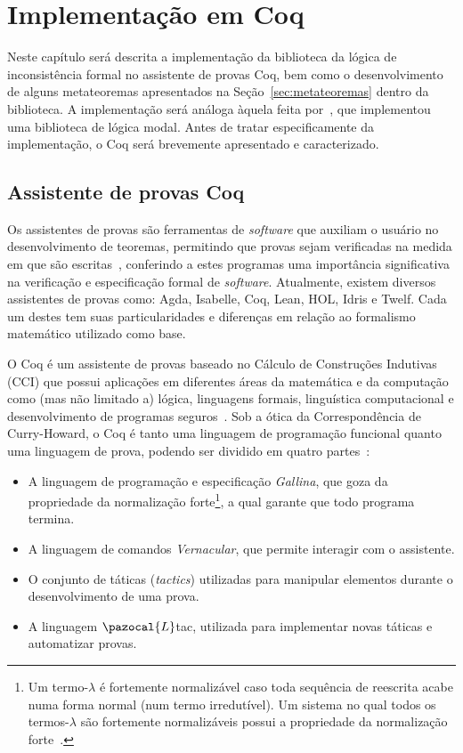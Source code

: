 \chapter{Implementação em Coq}\label{cap:implementacao}

Neste capítulo será descrita a implementação da biblioteca da lógica de inconsistência formal \lfium{} no assistente de provas Coq, bem como o desenvolvimento de alguns metateoremas apresentados na Seção~\ref{sec:metateoremas} dentro da biblioteca. A implementação será análoga àquela feita por~, que implementou uma biblioteca de lógica modal. Antes de tratar especificamente da implementação, o Coq será brevemente apresentado e caracterizado.

\section{Assistente de provas Coq}\label{sec:coq}
    Os assistentes de provas são ferramentas de \textit{software} que auxiliam o usuário no desenvolvimento de teoremas, permitindo que provas sejam verificadas na medida em que são escritas~\cite{geuvers2009proof}, conferindo a estes programas uma importância significativa na verificação e especificação formal de \textit{software}. Atualmente, existem diversos assistentes de provas como: Agda, Isabelle, Coq, Lean, HOL, Idris e Twelf. Cada um destes tem suas particularidades e diferenças em relação ao formalismo matemático utilizado como base.

    O Coq é um assistente de provas baseado no Cálculo de Construções Indutivas (CCI) que possui aplicações em diferentes áreas da matemática e da computação como (mas não limitado a) lógica, linguagens formais, linguística computacional e desenvolvimento de programas seguros~\cite{coqart}. Sob a ótica da Correspondência de Curry{-}Howard, o Coq é tanto uma linguagem de programação funcional quanto uma linguagem de prova, podendo ser dividido em quatro partes~\cite{silva2019certificaccao}:
    
    \begin{itemize}
        \item A linguagem de programação e especificação \textit{Gallina}, que goza da propriedade da normalização forte\footnote{Um termo-$\lambda$ é fortemente normalizável caso toda sequência de reescrita acabe numa forma normal (num termo irredutível). Um sistema no qual todos os termos-$\lambda$ são fortemente normalizáveis possui a propriedade da normalização forte~\cite{nipkow2006rewriting}.}, a qual garante que todo programa termina.
        \item A linguagem de comandos \textit{Vernacular}, que permite interagir com o assistente.
        \item O conjunto de táticas (\textit{tactics}) utilizadas para manipular elementos durante o desenvolvimento de uma prova.
        \item A linguagem $\pazocal{L}$tac, utilizada para implementar novas táticas e automatizar provas.
    \end{itemize}

